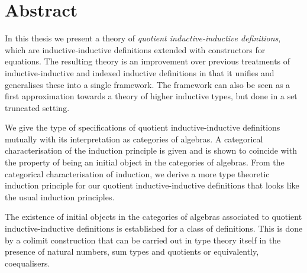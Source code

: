 \chapter*{Abstract}

In this thesis we present a theory of \emph{quotient
  inductive-inductive definitions}, which are inductive-inductive
definitions extended with constructors for equations. The resulting
theory is an improvement over previous treatments of
inductive-inductive and indexed inductive definitions in that it
unifies and generalises these into a single framework. The framework
can also be seen as a first approximation towards a theory of higher
inductive types, but done in a set truncated setting.

We give the type of specifications of quotient inductive-inductive
definitions mutually with its interpretation as categories of
algebras. A categorical characterisation of the induction principle is
given and is shown to coincide with the property of being an initial
object in the categories of algebras. From the categorical
characterisation of induction, we derive a more type theoretic
induction principle for our quotient inductive-inductive definitions
that looks like the usual induction principles.

The existence of initial objects in the categories of algebras
associated to quotient inductive-inductive definitions is established
for a class of definitions. This is done by a colimit construction
that can be carried out in type theory itself in the presence of
natural numbers, sum types and quotients or equivalently,
coequalisers.
